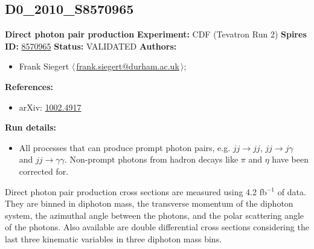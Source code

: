 \subsection[D0\_2010\_S8570965]{D0\_2010\_S8570965\,\cite{Abazov:2010ah}}
\textbf{Direct photon pair production}\newline
\textbf{Experiment:} CDF (Tevatron Run 2) \newline
\textbf{Spires ID:} \href{http://www.slac.stanford.edu/spires/find/hep/www?rawcmd=key+8570965}{8570965}\newline
\textbf{Status:} VALIDATED\newline
\textbf{Authors:}
\begin{itemize}
  \item Frank Siegert $\langle\,$\href{mailto:frank.siegert@durham.ac.uk}{frank.siegert@durham.ac.uk}$\,\rangle$;
\end{itemize}
\textbf{References:}
\begin{itemize}
  \item arXiv: \href{http://arxiv.org/abs/1002.4917}{1002.4917}
\end{itemize}
\textbf{Run details:}
\begin{itemize}

  \item All processes that can produce prompt photon pairs, e.g. $jj \to jj$, $jj \to j\gamma$ and $jj \to \gamma \gamma$. Non-prompt photons from hadron decays like $\pi$ and $\eta$ have been corrected for.\end{itemize}

\noindent Direct photon pair production cross sections are measured using 4.2 fb$^{-1}$ of data. They are binned in diphoton mass, the transverse momentum of the diphoton system, the azimuthal angle between the photons, and the polar scattering angle of the photons. Also available are double differential cross sections considering the last three kinematic variables in three diphoton mass bins.

\clearpage


\clearpage

